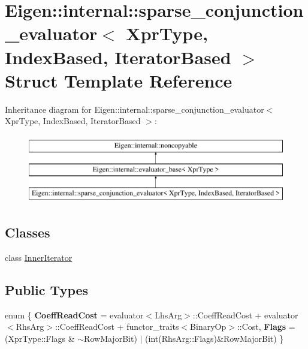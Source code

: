\hypertarget{struct_eigen_1_1internal_1_1sparse__conjunction__evaluator_3_01_xpr_type_00_01_index_based_00_01_iterator_based_01_4}{}\section{Eigen\+::internal\+::sparse\+\_\+conjunction\+\_\+evaluator$<$ Xpr\+Type, Index\+Based, Iterator\+Based $>$ Struct Template Reference}
\label{struct_eigen_1_1internal_1_1sparse__conjunction__evaluator_3_01_xpr_type_00_01_index_based_00_01_iterator_based_01_4}
Inheritance diagram for Eigen\+::internal\+::sparse\+\_\+conjunction\+\_\+evaluator$<$ Xpr\+Type, Index\+Based, Iterator\+Based $>$\+:\begin{figure}[H]
\begin{center}
\leavevmode
\includegraphics[height=3.000000cm]{struct_eigen_1_1internal_1_1sparse__conjunction__evaluator_3_01_xpr_type_00_01_index_based_00_01_iterator_based_01_4}
\end{center}
\end{figure}
\subsection*{Classes}
\begin{DoxyCompactItemize}
\item 
class \mbox{\hyperlink{class_eigen_1_1internal_1_1sparse__conjunction__evaluator_3_01_xpr_type_00_01_index_based_00_01_a04df7f6b82f87bde9590608a6f941de}{Inner\+Iterator}}
\end{DoxyCompactItemize}
\subsection*{Public Types}
\begin{DoxyCompactItemize}
\item 
\mbox{\label{struct_eigen_1_1internal_1_1sparse__conjunction__evaluator_3_01_xpr_type_00_01_index_based_00_01_iterator_based_01_4_acd5664a15514d7539cdf615e275d7b4c}} 
enum \{ {\bfseries Coeff\+Read\+Cost} = evaluator$<$Lhs\+Arg$>$\+::Coeff\+Read\+Cost + evaluator$<$Rhs\+Arg$>$\+::Coeff\+Read\+Cost + functor\+\_\+traits$<$Binary\+Op$>$\+::Cost, 
{\bfseries Flags} = (Xpr\+Type\+::Flags \& $\sim$\+Row\+Major\+Bit) $\vert$ (int(Rhs\+Arg\+::Flags)\&Row\+Major\+Bit)
 \}
\end{DoxyCompactItemize}

